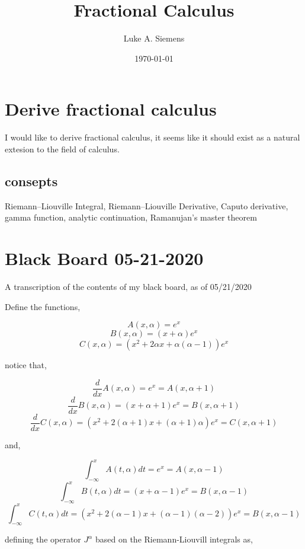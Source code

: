 \documentclass[%
 preprint,
 amsmath, amssymb, aps, pra, 10pt
]{revtex4-2}
\begin{document}
\title{Fractional Calculus}%

\author{Luke A. Siemens}
\noaffiliation

\date{\today}

\maketitle

\section{Derive fractional calculus}
I would like to derive fractional calculus, it seems like it should exist as a natural extesion to the field of calculus.

\subsection{consepts}
Riemann–Liouville Integral, Riemann–Liouville Derivative, Caputo derivative, gamma function, analytic continuation, Ramanujan's master theorem

\section{Black Board 05-21-2020}

A transcription of the contents of my black board, as of 05/21/2020

Define the functions,

\[A(x, \alpha) = e^x\]
\[B(x, \alpha) = \left(x + \alpha \right)e^x\]
\[C(x, \alpha) = \left(x^2 + 2\alpha x + \alpha (\alpha - 1) \right)e^x\]

notice that,

\[\frac{d}{dx} A(x, \alpha) = e^x = A(x, \alpha + 1)\]
\[\frac{d}{dx} B(x, \alpha) = \left(x + \alpha + 1 \right)e^x = B(x, \alpha + 1)\]
\[\frac{d}{dx} C(x, \alpha) = \left(x^2 + 2(\alpha + 1) x + (\alpha + 1)\alpha \right)e^x = C(x, \alpha + 1)\]

and,

\[\int_{-\infty}^xA(t, \alpha)dt = e^x = A(x, \alpha - 1)\]
\[\int_{-\infty}^xB(t, \alpha)dt = \left(x + \alpha - 1 \right)e^x = B(x, \alpha - 1)\]
\[\int_{-\infty}^xC(t, \alpha)dt = \left(x^2 + 2(\alpha - 1) x + (\alpha - 1)(\alpha - 2)\right)e^x = B(x, \alpha - 1)\]

defining the operator $J^\alpha$ based on the Riemann-Liouvill integrals as,
\end{document}
